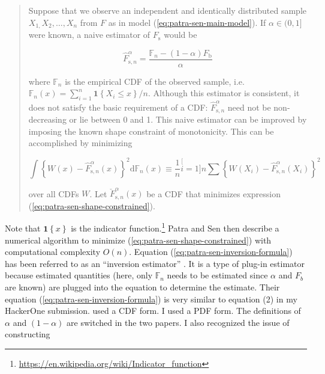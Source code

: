 \documentclass[english]{article}
\begin{document}
\begin{quote}
Suppose that we observe an independent and identically distributed
sample $X_{1,}X_{2},\ldots,X_{n}$ from $F$ as in model (\ref{eq:patra-sen-main-model}).
If $\alpha\in(0,1]$ were known, a naive estimator of $F_{\mathrm{s}}$
would be

\begin{equation}
\hat{F}_{\mathrm{s},n}^{\alpha}=\dfrac{\mathbb{F}_{n}-(1-\alpha)F_{\mathrm{b}}}{\alpha}\label{eq:patra-sen-inversion-formula}
\end{equation}

where $\mathbb{F}_{n}$ is the empirical CDF of the observed sample,
i.e. $\mathbb{F}_{n}(x)=\sum_{i=1}^{n}\mathbf{1}\left\{ X_{i}\leqslant x\right\} /n$.
Although this estimator is consistent, it does not satisfy the basic
requirement of a CDF: $\hat{F}_{\mathrm{s},n}^{\alpha}$ need not
be non-decreasing or lie between 0 and 1. This naive estimator can
be improved by imposing the known shape constraint of monotonicity.
This can be accomplished by minimizing

\begin{equation}
\int\left\{ W(x)-\hat{F}_{\mathrm{s},n}^{\alpha}(x)\right\} ^{2}\mathrm{d}\mathbb{F}_{n}(x)\equiv\dfrac{1}{n}\stackrel[i=1]{n}{\sum}\left\{ W(X_{i})-\hat{F}_{\mathrm{s},n}^{\alpha}(X_{i})\right\} ^{2}\label{eq:patra-sen-shape-constrained}
\end{equation}

over all CDFs $W$. Let $\check{F}_{\mathrm{s},n}^{\alpha}(x)$ be
a CDF that minimizes expression (\ref{eq:patra-sen-shape-constrained}).
\end{quote}
Note that $\mathbf{1}\left\{ x\right\} $ is the indicator function.\footnote{\href{https://en.wikipedia.org/wiki/Indicator_function}{https://en.wikipedia.org/wiki/Indicator\_function}}
Patra and Sen then describe a numerical algorithm to minimize (\ref{eq:patra-sen-shape-constrained})
with computational complexity $O(n)$. Equation (\ref{eq:patra-sen-inversion-formula})
has been referred to as an ``inversion estimator'' \cite{milhaud:hal-03201760}.
It is a type of plug-in estimator because estimated quantities (here,
only $\mathbb{F}_{n}$ needs to be estimated since $\alpha$ and $F_{b}$
are known) are plugged into the equation to determine the estimate.
Their equation (\ref{eq:patra-sen-inversion-formula}) is very similar
to equation (2) in my HackerOne submission. \cite{Patra2016} used
a CDF form. I used a PDF form. The definitions of $\alpha$ and $(1-\alpha)$
are switched in the two papers. I also recognized the issue of constructing
\end{document}
